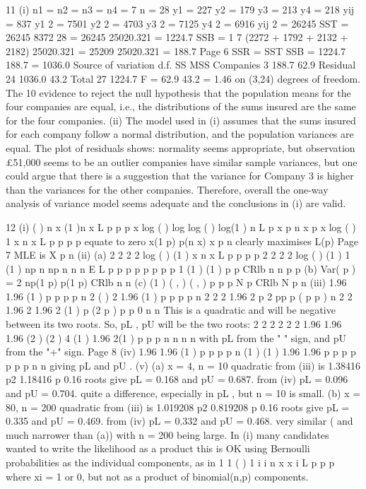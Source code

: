 11 (i) n1 = n2 = n3 = n4 = 7 n = 28
y1 = 227 y2 = 179 y3 = 213 y4 = 218 yij = 837
y1
2 = 7501 y2
2 = 4703 y3
2 = 7125 y4
2 = 6916 yij
2 = 26245
SST = 26245
8372
28
= 26245 25020.321 = 1224.7
SSB =
1
7
(2272 + 1792 + 2132 + 2182) 25020.321
= 25209 25020.321 = 188.7
Page 6
SSR = SST SSB = 1224.7 188.7 = 1036.0
Source of variation d.f. SS MSS
Companies 3 188.7 62.9
Residual 24 1036.0 43.2
Total 27 1224.7
F =
62.9
43.2
= 1.46 on (3,24) degrees of freedom.
The 10%
evidence to reject the null hypothesis that the population means for the four
companies are equal, i.e., the distributions of the sums insured are the same for
the four companies.
(ii) The model used in (i) assumes that the sums insured for each company follow
a normal distribution, and the population variances are equal.
The plot of residuals shows:
normality seems appropriate, but observation £51,000 seems to be an
outlier
companies have similar sample variances, but one could argue that there is
a suggestion that the variance for Company 3 is higher than the variances
for the other companies.
Therefore, overall the one-way analysis of variance model seems adequate and
the conclusions in (i) are valid.

12 (i) ( ) n x (1 )n x
L p p p
x
log ( ) log log ( ) log(1 )
n
L p x p n x p
x
log ( )
1
x n x
L p
p p p
equate to zero x(1 p) p(n x)
x
p
n
clearly maximises L(p)
Page 7
MLE is
X
p
n
(ii) (a)
2
2 2 2 log ( )
(1 )
x n x
L p
p p p
2
2 2 2 log ( )
(1 ) 1 (1 )
np n np n n n
E L p
p p p p p p p
1 (1 )
(1 )
p p
CRlb
n n
p p
(b) Var( p ) = 2
np(1 p) p(1 p)
CRlb
n n
(c)
(1 )
( , ) ( , )
p p
p N p CRlb N p
n
(iii) 1.96 1.96
(1 )
p p
p p
n
2
( ) 2
1.96
(1 )
p p
p p
n
2
2 2 1.96 2
p 2 pp p ( p p )
n
2 2
1.96 2 1.96 2
(1 ) p (2 p ) p p 0
n n
This is a quadratic and will be negative between its two roots.
So, pL , pU will be the two roots:
2 2 2
2 2
2
1.96 1.96 1.96
(2 ) (2 ) 4 (1 )
1.96
2(1 )
p p p
n n n
n
with pL from the " " sign, and pU from the "+" sign.
Page 8
(iv) 1.96 1.96
(1 )
p p
p p
n
(1 ) (1 )
1.96 1.96
p p p p
p p p
n n
giving pL and pU .
(v) (a) x = 4, n = 10
quadratic from (iii) is 1.38416 p2 1.18416 p 0.16
roots give pL = 0.168 and pU = 0.687.
from (iv) pL = 0.096 and pU = 0.704.
quite a difference, especially in pL , but n = 10 is small.
(b) x = 80, n = 200
quadratic from (iii) is 1.019208 p2 0.819208 p 0.16
roots give pL = 0.335 and pU = 0.469.
from (iv) pL = 0.332 and pU = 0.468.
very similar ( and much narrower than (a)) with n = 200 being large.
In (i) many candidates wanted to write the likelihood as a product this is OK using
Bernoulli probabilities as the individual components, as in
1
1
( ) 1 i i
n
x x
i
L p p p
where xi = 1 or 0, but not as a product of binomial(n,p) components.
